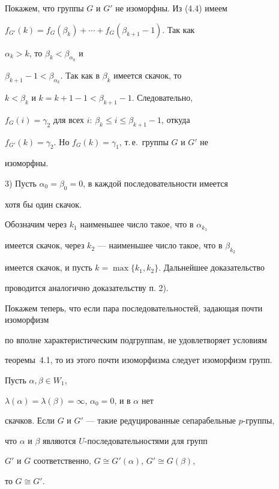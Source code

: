 \begin{pf}
Покажем, что группы $G$ и $G'$ не изоморфны. Из (4.4) имеем


$f_{G'}(k)=f_G(\beta_k)+\dotsb+f_G(\beta_{k+1}-1)$. Так как


$\alpha_k>k$, то $\beta_k<\beta_{\alpha_k}$ и


$\beta_{k+1}-1<\beta_{\alpha_k}$. Так как в $\beta_k$ имеется скачок, то


$k<\beta_k$ и $k=k+1-1<\beta_{k+1}-1$. Следовательно,


$f_G(i)=\gamma_2$ для всех $i$: $\beta_k\leq i\leq\beta_{k+1}-1$, откуда


$f_{G'}(k)=\gamma_2$. Но $f_G(k)=\gamma_1$, т.\,е.\ группы $G$ и $G'$ не


изоморфны.





3) Пусть $\alpha_0=\beta_0=0$, в каждой последовательности имеется


хотя бы один скачок.


Обозначим через $k_1$ наименьшее число такое, что в $\alpha_{k_1}$


имеется скачок, через $k_2$ --- наименьшее число такое, что в  $\beta_{k_2}$


имеется скачок, и пусть $k=\max\{k_1,k_2\}$. Дальнейшее доказательство


проводится аналогично доказательству п. 2).


\end{pf}





Покажем теперь, что если пара последовательностей, задающая почти изоморфизм


по вполне характеристическим подгруппам, не удовлетворяет условиям


теоремы~4.1, то из этого почти изоморфизма следует изоморфизм групп.





\begin{thms}


Пусть $\alpha,\beta\in W_1$,


$\lambda(\alpha)=\lambda(\beta)=\infty$, $\alpha_0=0$, и в $\alpha$ нет


скачков. Если $G$ и $G'$ --- такие редуцированные сепарабельные $p$-группы,


что $\alpha$ и $\beta$ являются $U$-последовательностями для групп


$G'$ и $G$ соответственно, $G\cong G'(\alpha)$, $G'\cong G(\beta)$,


то $G\cong G'$.


\end{thms}





